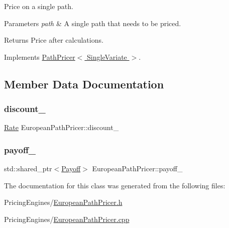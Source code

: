 Price on a single path. 


\begin{DoxyParams}{Parameters}
{\em path} & A single path that needs to be priced. \\
\hline
\end{DoxyParams}
\begin{DoxyReturn}{Returns}
Price after calculations. 
\end{DoxyReturn}


Implements \hyperlink{class_path_pricer_a14b2a03f259bb56a24a66c9b95bdcf67}{Path\+Pricer$<$ Single\+Variate $>$}.



\subsection{Member Data Documentation}
\hypertarget{class_european_path_pricer_a1bb1874fe4f263bff17a998f0ec9588c}{}\label{class_european_path_pricer_a1bb1874fe4f263bff17a998f0ec9588c} 
\subsubsection{\texorpdfstring{discount\+\_\+}{discount\_}}
{\footnotesize\ttfamily \hyperlink{_name_def_8h_a25bee43a162de339c81f3d1caf6b887d}{Rate} European\+Path\+Pricer\+::discount\+\_\+\hspace{0.3cm}{\ttfamily [private]}}

\hypertarget{class_european_path_pricer_a2023ec56bae32c6db123e8d400d2b0cf}{}\label{class_european_path_pricer_a2023ec56bae32c6db123e8d400d2b0cf} 
\subsubsection{\texorpdfstring{payoff\+\_\+}{payoff\_}}
{\footnotesize\ttfamily std\+::shared\+\_\+ptr$<$\hyperlink{class_payoff}{Payoff}$>$ European\+Path\+Pricer\+::payoff\+\_\+\hspace{0.3cm}{\ttfamily [private]}}



The documentation for this class was generated from the following files\+:\begin{DoxyCompactItemize}
\item 
Pricing\+Engines/\hyperlink{_european_path_pricer_8h}{European\+Path\+Pricer.\+h}\item 
Pricing\+Engines/\hyperlink{_european_path_pricer_8cpp}{European\+Path\+Pricer.\+cpp}\end{DoxyCompactItemize}
